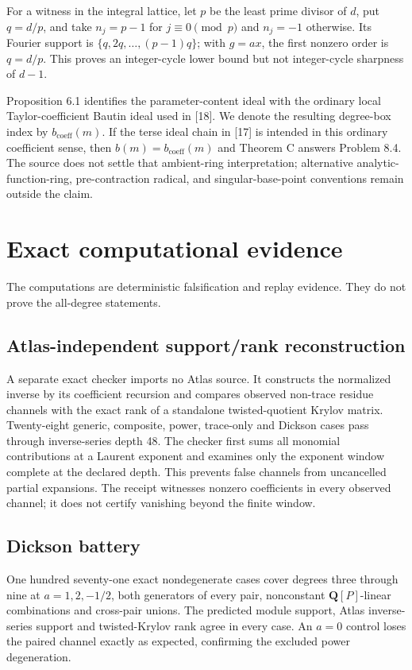 \documentclass[
  11pt,
  a4paper,
]{amsart}
\begin{document}
For a witness in the integral lattice, let \(p\) be the least prime
divisor of \(d\), put \(q=d/p\), and take \(n_j=p-1\) for
\(j\equiv0\pmod p\) and \(n_j=-1\) otherwise. Its Fourier support is
\(\{q,2q,\ldots,(p-1)q\}\); with \(g=ax\), the first nonzero order is
\(q=d/p\). This proves an integer-cycle lower bound but not
integer-cycle sharpness of \(d-1\).

Proposition 6.1 identifies the parameter-content ideal with the ordinary
local Taylor-coefficient Bautin ideal used in {[}18{]}. We denote the
resulting degree-box index by \(b_{\mathrm{coeff}}(m)\). If the terse
ideal chain in {[}17{]} is intended in this ordinary coefficient sense,
then \(b(m)=b_{\mathrm{coeff}}(m)\) and Theorem C answers Problem 8.4.
The source does not settle that ambient-ring interpretation; alternative
analytic-function-ring, pre-contraction radical, and singular-base-point
conventions remain outside the claim.

\section{Exact computational evidence}

The computations are deterministic falsification and replay evidence.
They do not prove the all-degree statements.

\subsection{Atlas-independent support/rank reconstruction}

A separate exact checker imports no Atlas source. It constructs the
normalized inverse by its coefficient recursion and compares observed
non-trace residue channels with the exact rank of a standalone
twisted-quotient Krylov matrix. Twenty-eight generic, composite, power,
trace-only and Dickson cases pass through inverse-series depth 48. The
checker first sums all monomial contributions at a Laurent exponent and
examines only the exponent window complete at the declared depth. This
prevents false channels from uncancelled partial expansions. The receipt
witnesses nonzero coefficients in every observed channel; it does not
certify vanishing beyond the finite window.

\subsection{Dickson battery}

One hundred seventy-one exact nondegenerate cases cover degrees three
through nine at \(a=1,2,-1/2\), both generators of every pair,
nonconstant \(\mathbf Q[P]\)-linear combinations and cross-pair unions.
The predicted module support, Atlas inverse-series support and
twisted-Krylov rank agree in every case. An \(a=0\) control loses the
paired channel exactly as expected, confirming the excluded power
degeneration.
\end{document}
